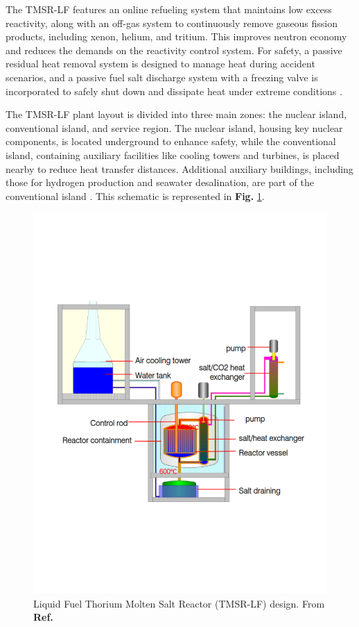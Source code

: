The TMSR-LF features an online refueling system that maintains low excess reactivity, along with an off-gas system to continuously remove gaseous fission products, including xenon, helium, and tritium. This improves neutron economy and reduces the demands on the reactivity control system. For safety, a passive residual heat removal system is designed to manage heat during accident scenarios, and a passive fuel salt discharge system with a freezing valve is incorporated to safely shut down and dissipate heat under extreme conditions \cite{TMSR_book}.

The TMSR-LF plant layout is divided into three main zones: the nuclear island, conventional island, and service region. The nuclear island, housing key nuclear components, is located underground to enhance safety, while the conventional island, containing auxiliary facilities like cooling towers and turbines, is placed nearby to reduce heat transfer distances. Additional auxiliary buildings, including those for hydrogen production and seawater desalination, are part of the conventional island \cite{TMSR_book}. This schematic is represented in \textbf{Fig.} \ref{fig:TMSR-LF}.

\begin{figure}[H]
    \centering
    \includegraphics[scale=0.5]{Kap6/Figures_Kap6/TMSR-LF_2.png}
    \caption{Liquid Fuel Thorium Molten Salt Reactor (TMSR-LF) design. From \textbf{Ref.} \cite{Xu2017}}
    \label{fig:TMSR-LF}    
\end{figure}

